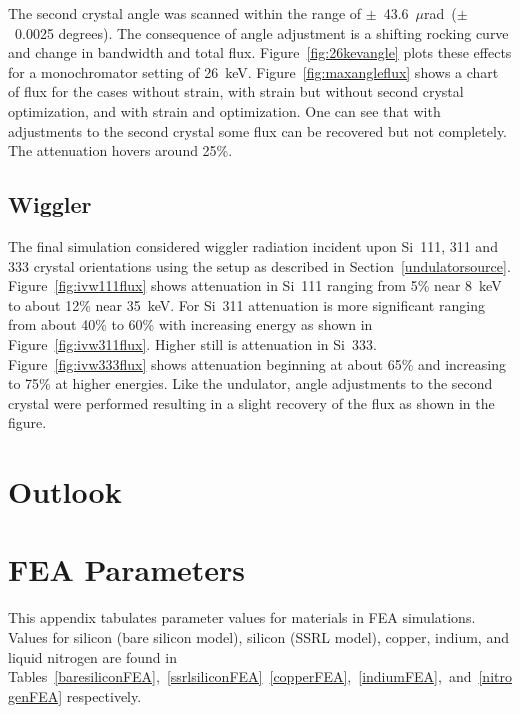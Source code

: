 \documentclass{iucr}
\begin{document}
The second crystal angle was scanned within the range of $\pm$~43.6~$\mu$rad~($\pm$~0.0025 degrees). The consequence of angle adjustment is a shifting rocking curve and change in bandwidth and total flux. Figure~\ref{fig:26kevangle} plots these effects for a monochromator setting of 26~keV. Figure~\ref{fig:maxangleflux} shows a chart of flux for the cases without strain, with strain but without second crystal optimization, and with strain and optimization. One can see that with adjustments to the second crystal some flux can be recovered but not completely. The attenuation hovers around 25\%.

\subsection{Wiggler}
The final simulation considered wiggler radiation incident upon Si~111, 311 and 333 crystal orientations using the setup as described in Section~\ref{undulatorsource}. Figure~\ref{fig:ivw111flux} shows attenuation in Si~111 ranging from 5\% near 8~keV to about 12\% near 35~keV. For Si~311 attenuation is more significant ranging from about 40\% to 60\% with increasing energy as shown in Figure~\ref{fig:ivw311flux}. Higher still is attenuation in Si~333. Figure~\ref{fig:ivw333flux} shows attenuation beginning at about 65\% and increasing to 75\% at higher energies. Like the undulator, angle adjustments to the second crystal were performed resulting in a slight recovery of the flux as shown in the figure.




\section{Outlook}


\appendix

\section{FEA Parameters}\label{feaparameters}

This appendix tabulates parameter values for materials in FEA simulations. Values for silicon (bare silicon model), silicon (SSRL model), copper, indium, and liquid nitrogen are found in Tables~\ref{baresiliconFEA},~\ref{ssrlsiliconFEA}~\ref{copperFEA},~\ref{indiumFEA},~and~\ref{nitrogenFEA} respectively.
\vspace{1.5cm}
\end{document}
